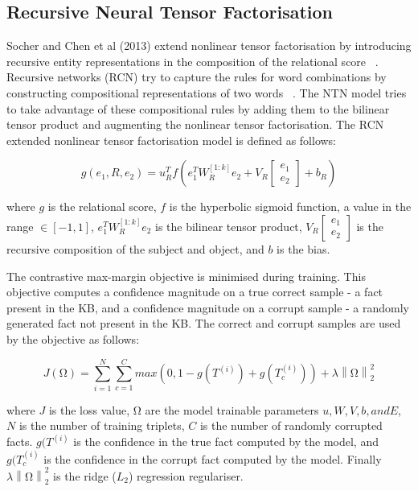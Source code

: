 \subsection{Recursive Neural Tensor Factorisation}
Socher and Chen et al (2013) extend nonlinear tensor factorisation by introducing recursive entity representations in the composition of the relational score ~\citep{socher2013reasoning}. Recursive networks (RCN) try to capture the rules for word combinations by constructing compositional representations of two words ~\citep{socher2012semantic}. The NTN model tries to take advantage of these compositional rules by adding them to the bilinear tensor product and augmenting the nonlinear tensor factorisation. The RCN extended nonlinear tensor factorisation model is defined as follows:

\begin{equation}
	g(e_1, R, e_2) =  u_R^Tf(e_1^TW_R^{\left [1:k\right ]}e_2 + V_R\left [ \begin{matrix} e_1 \\ e_2 \end{matrix} \right ] + b_R)
\end{equation}

where $g$ is the relational score, $f$ is the hyperbolic sigmoid function, a value in the range $\in \left [ -1, 1 \right ]$, $e_1^TW_R^{\left [1:k\right ]}e_2 $ is the bilinear tensor product, $V_R\left [ \begin{matrix} e_1 \\ e_2 \end{matrix} \right ]$ is the recursive composition of the subject and object, and $b$ is the bias. \newline

The contrastive max-margin objective is minimised during training. This objective computes a confidence magnitude on a true correct sample - a fact present in the KB, and a confidence magnitude on a corrupt sample - a randomly generated fact not present in the KB. The correct and corrupt samples are used by the objective as follows:

\begin{equation}
	J(\si{\ohm}) =  \sum_{i=1}^N\sum_{c=1}^Cmax(0,1 - g(T^{(i)}) + g(T_c^{(i)})) + \lambda\left\lVert \si{\ohm} \right\rVert_2^2
\end{equation}

where $J$ is the loss value, $\si{\ohm}$ are the model trainable parameters $u, W, V, b, and E$, $N$ is the number of training triplets, $C$ is the number of randomly corrupted facts. $g(T^{(i)}$ is the confidence in the true fact computed by the model, and $ g(T_c^{(i)}$ is the confidence in the corrupt fact computed by the model. Finally $\lambda\left\lVert \si{\ohm} \right\rVert_2^2$ is the ridge ($L_2$) regression regulariser. \bigskip

